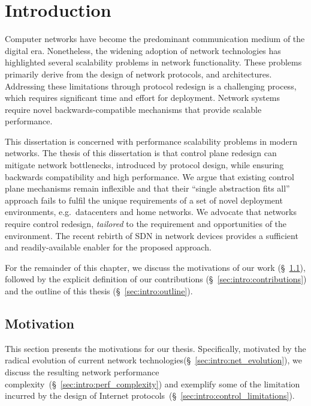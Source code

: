 \chapter{Introduction} \label{s:introduction:introduction}

Computer networks have become the predominant communication medium of the
digital era. Nonetheless, the widening adoption of network technologies has
highlighted several scalability problems in network functionality. These
problems primarily derive from the design of network protocols, and architectures.
Addressing these limitations through protocol redesign is a challenging process,
which requires significant time and effort for deployment. Network systems
require novel backwards-compatible mechanisms that provide scalable performance. 

This dissertation is concerned with performance scalability problems in modern
networks.  The thesis of this dissertation is that control plane redesign can
mitigate network bottlenecks, introduced by protocol design, while ensuring
backwards compatibility and high performance. We argue that existing control
plane mechanisms remain inflexible and that their ``single abstraction fits all''
approach fails to fulfil the unique requirements of a set of novel deployment
environments, e.g.~datacenters and home networks.  We advocate that
networks require control redesign, \textit{tailored} to the requirement and
opportunities of  the environment. The recent rebirth of SDN in network devices
provides a sufficient and readily-available enabler for the proposed approach. 

For the remainder of this chapter, we discuss the motivations of our work
(\S~\ref{sec:intro:motivations}), followed by the explicit definition of our
contributions (\S~\ref{sec:intro:contributions}) and  the outline of this thesis
(\S~\ref{sec:intro:outline}).

\section{Motivation} \label{sec:intro:motivations}

This section presents the motivations for our thesis. Specifically, motivated by
the radical evolution of current network
technologies(\S~\ref{sec:intro:net_evolution}), we discuss the resulting network
performance complexity~(\S~\ref{sec:intro:perf_complexity}) and exemplify some
of the limitation incurred by the design of Internet
protocols~(\S~\ref{sec:intro:control_limitations}).

